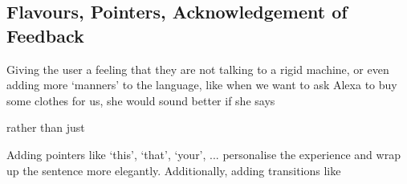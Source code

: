 \subsection*{Flavours, Pointers, Acknowledgement of Feedback}
Giving the user a feeling that they are not talking to a rigid machine, or even adding more `manners' to the language, like when we want to ask Alexa to buy some clothes for us, she would sound better if she says 



\begin{flushright}
\end{flushright}


\noindent rather than just 


\begin{flushright}
\end{flushright}



\noindent Adding pointers like `this', `that', `your', ... personalise the experience and wrap up the sentence more elegantly. Additionally, adding transitions like 
\begin{flushright}
\end{flushright}




